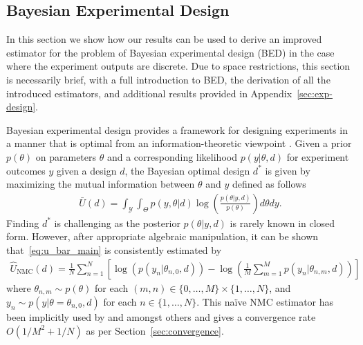 \subsection{Bayesian Experimental Design}
\label{sec:bo-design}

In this section we show how our results can be used to derive an improved estimator for the problem of
Bayesian experimental design (BED) in the case where the experiment outputs are discrete.  Due to space
restrictions, this section is necessarily brief, with a full introduction to BED, the derivation of all
the introduced estimators, and additional results provided in Appendix~\ref{sec:exp-design}.

Bayesian experimental design provides a framework for designing experiments in a manner that is optimal from
an information-theoretic viewpoint \citep{chaloner1995bayesian,sebastiani2000maximum}.  Given a prior
$p(\theta)$ on parameters $\theta$ and a corresponding likelihood $p(y|\theta,d)$ for experiment 
outcomes $y$ given a design $d$, the Bayesian optimal design $d^*$ is given by maximizing the mutual
information between $\theta$ and $y$ defined as follows
\begin{align}
\bar{U}(d)=
\int_{\mathcal{Y}}\int_{\Theta} p(y,\theta | d)\log\left(\frac{p(\theta |y, d)}{p(\theta)}\right)d\theta dy. 
\label{eq:u_bar_main}
\end{align}
Finding $d^*$ is challenging as the posterior $p(\theta |y, d)$ is rarely known in closed form.  
However, after appropriate algebraic manipulation, it can be shown that~\eqref{eq:u_bar_main}
is consistently estimated by
\begin{align}
\label{eq:exp-des-nmc-main}
\hat{U}_{\text{NMC}}(d) =
\frac{1}{N} \sum_{n=1}^{N} \left[ \log(p(y_n | \theta_{n,0},d)) 
- \log \left(\frac{1}{M} \sum_{m=1}^{M}p(y_n | \theta_{n,m},d)\right) \right]
\end{align}
where $\theta_{n,m} \sim p(\theta)$ for each $(m,n) \in \{0,\ldots,M\}\times \{1,\ldots,N\}$, 
and $y_n \sim p(y|\theta=\theta_{n,0}, d)$ for each $n \in \{1,\ldots,N\}$.  
This na\"{i}ve NMC estimator has been implicitly used by \cite{myung2013tutorial} and \cite{ouyang2016practical} amongst others and gives a convergence
rate $O(1/M^2+1/N)$ as per Section~\ref{sec:convergence}.

